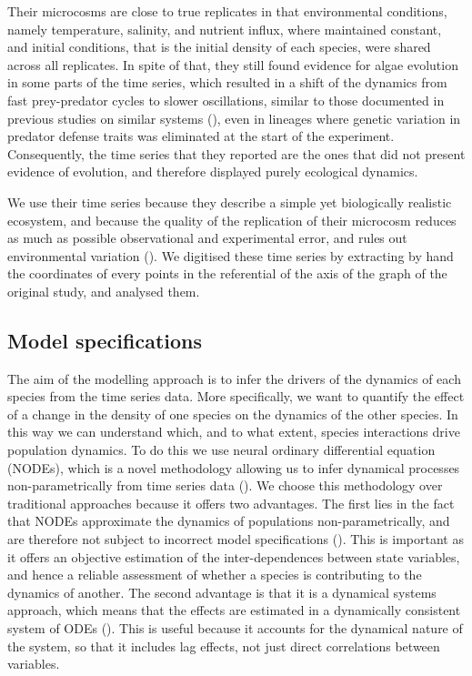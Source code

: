 \documentclass[11pt, oneside]{article}
\begin{document}
Their microcosms are close to true replicates in that environmental conditions, namely temperature, salinity, and nutrient influx, where maintained constant, and initial conditions, that is the initial density of each species, were shared across all replicates. 
In spite of that, they still found evidence for algae evolution in some parts of the time series, which resulted in a shift of the dynamics from fast prey-predator cycles to slower oscillations, similar to those documented in previous studies on similar systems (\cite{Yoshida2003, Becks2010}), even in lineages where genetic variation in predator defense traits was eliminated at the start of the experiment. 
Consequently, the time series that they reported are the ones that did not present evidence of evolution, and therefore displayed purely ecological dynamics.

We use their time series because they describe a simple yet biologically realistic ecosystem, and because the quality of the replication of their microcosm reduces as much as possible observational and experimental error, and rules out environmental variation (\cite{Hiltunen2013}).
We digitised these time series by extracting by hand the coordinates of every points in the referential of the axis of the graph of the original study, and analysed them.

\subsection{Model specifications}

The aim of the modelling approach is to infer the drivers of the dynamics of each species from the time series data. 
More specifically, we want to quantify the effect of a change in the density of one species on the dynamics of the other species.
In this way we can understand which, and to what extent, species interactions drive population dynamics.
To do this we use neural ordinary differential equation (NODEs), which is a novel methodology allowing us to infer dynamical processes non-parametrically from time series data (\cite{Bonnaffe2021a}).
We choose this methodology over traditional approaches because it offers two advantages. 
The first lies in the fact that NODEs approximate the dynamics of populations non-parametrically, and are therefore not subject to incorrect model specifications (\cite{Jost2000,Adamson2013}).
This is important as it offers an objective estimation of the inter-dependences between state variables, and hence a reliable assessment of whether a species is contributing to the dynamics of another. 
The second advantage is that it is a dynamical systems approach, which means that the effects are estimated in a dynamically consistent system of ODEs (\cite{Bonnaffe2021a}). 
This is useful because it accounts for the dynamical nature of the system, so that it includes lag effects, not just direct correlations between variables. 
\end{document}
